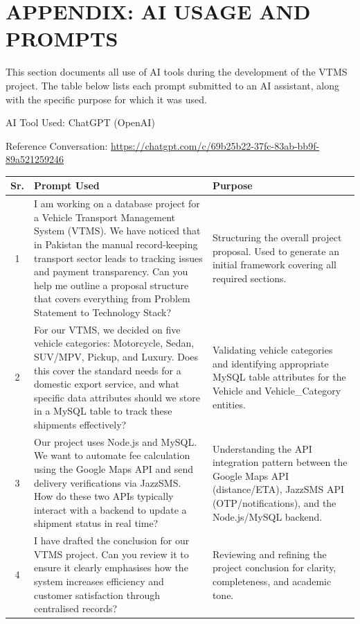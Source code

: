 \documentclass[12pt,a4paper]{report}
\begin{document}
\chapter*{APPENDIX: AI USAGE AND PROMPTS}

This section documents all use of AI tools during the development of the VTMS project. The table below lists each prompt submitted to an AI assistant, along with the specific purpose for which it was used.

AI Tool Used: ChatGPT (OpenAI)

Reference Conversation: \url{https://chatgpt.com/c/69b25b22-37fc-83ab-bb9f-89a521259246}

\begin{longtable}{|c|p{7cm}|p{6cm}|}
\hline
\textbf{Sr.} & \textbf{Prompt Used} & \textbf{Purpose} \\
\hline

1 & I am working on a database project for a Vehicle Transport Management System (VTMS). We have noticed that in Pakistan the manual record-keeping transport sector leads to tracking issues and payment transparency. Can you help me outline a proposal structure that covers everything from Problem Statement to Technology Stack? & Structuring the overall project proposal. Used to generate an initial framework covering all required sections. \\
\hline

2 & For our VTMS, we decided on five vehicle categories: Motorcycle, Sedan, SUV/MPV, Pickup, and Luxury. Does this cover the standard needs for a domestic export service, and what specific data attributes should we store in a MySQL table to track these shipments effectively? & Validating vehicle categories and identifying appropriate MySQL table attributes for the Vehicle and Vehicle\_Category entities. \\
\hline

3 & Our project uses Node.js and MySQL. We want to automate fee calculation using the Google Maps API and send delivery verifications via JazzSMS. How do these two APIs typically interact with a backend to update a shipment status in real time? & Understanding the API integration pattern between the Google Maps API (distance/ETA), JazzSMS API (OTP/notifications), and the Node.js/MySQL backend. \\
\hline

4 & I have drafted the conclusion for our VTMS project. Can you review it to ensure it clearly emphasises how the system increases efficiency and customer satisfaction through centralised records? & Reviewing and refining the project conclusion for clarity, completeness, and academic tone. \\
\hline


\end{longtable}
\end{document}
